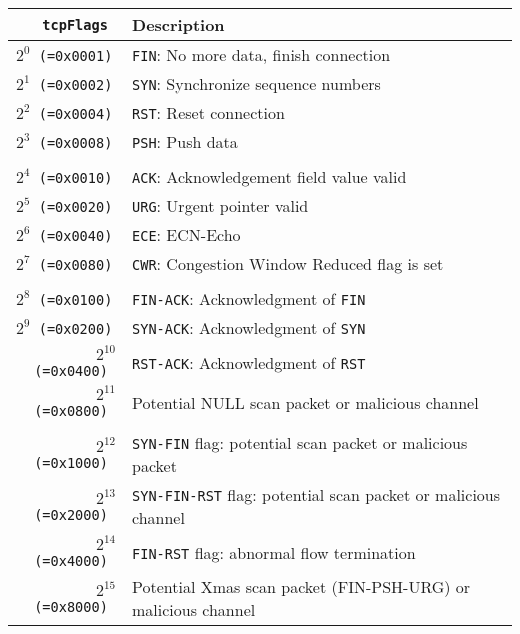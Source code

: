 \documentclass[documentation]{subfiles}
\begin{document}
\begin{longtable}{>{\tt}rl}
    \toprule
    {\bf tcpFlags} & {\bf Description}\\
    \midrule\endhead%
    $2^{0}$  (=0x0001) & {\tt FIN}: No more data, finish connection                         \\
    $2^{1}$  (=0x0002) & {\tt SYN}: Synchronize sequence numbers                            \\
    $2^{2}$  (=0x0004) & {\tt RST}: Reset connection                                        \\
    $2^{3}$  (=0x0008) & {\tt PSH}: Push data                                               \\
    \\
    $2^{4}$  (=0x0010) & {\tt ACK}: Acknowledgement field value valid                       \\
    $2^{5}$  (=0x0020) & {\tt URG}: Urgent pointer valid                                    \\
    $2^{6}$  (=0x0040) & {\tt ECE}: ECN-Echo                                                \\
    $2^{7}$  (=0x0080) & {\tt CWR}: Congestion Window Reduced flag is set                   \\
    \\
    $2^{8}$  (=0x0100) & {\tt FIN-ACK}: Acknowledgment of {\tt FIN}                         \\
    $2^{9}$  (=0x0200) & {\tt SYN-ACK}: Acknowledgment of {\tt SYN}                         \\
    $2^{10}$ (=0x0400) & {\tt RST-ACK}: Acknowledgment of {\tt RST}                         \\
    $2^{11}$ (=0x0800) & Potential NULL scan packet or malicious channel                    \\
    \\
    $2^{12}$ (=0x1000) & {\tt SYN-FIN} flag: potential scan packet or malicious packet      \\
    $2^{13}$ (=0x2000) & {\tt SYN-FIN-RST} flag: potential scan packet or malicious channel \\
    $2^{14}$ (=0x4000) & {\tt FIN-RST} flag: abnormal flow termination                      \\
    $2^{15}$ (=0x8000) & Potential Xmas scan packet (FIN-PSH-URG) or malicious channel      \\
    \bottomrule
\end{longtable}

\clearpage
\end{document}
